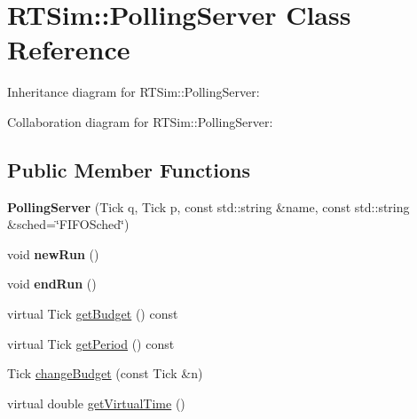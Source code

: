\hypertarget{classRTSim_1_1PollingServer}{}\section{R\+T\+Sim\+:\+:Polling\+Server Class Reference}
\label{classRTSim_1_1PollingServer}


Inheritance diagram for R\+T\+Sim\+:\+:Polling\+Server\+:


Collaboration diagram for R\+T\+Sim\+:\+:Polling\+Server\+:
\subsection*{Public Member Functions}
\begin{DoxyCompactItemize}
\item 
{\bfseries Polling\+Server} (Tick q, Tick p, const std\+::string \&name, const std\+::string \&sched=\char`\"{}F\+I\+F\+O\+Sched\char`\"{})\hypertarget{classRTSim_1_1PollingServer_af2c51ad7143c28f6b9cb95a1790c9998}{}\label{classRTSim_1_1PollingServer_af2c51ad7143c28f6b9cb95a1790c9998}

\item 
void {\bfseries new\+Run} ()\hypertarget{classRTSim_1_1PollingServer_a4d2658e714f1322fcc07c73e744f19d1}{}\label{classRTSim_1_1PollingServer_a4d2658e714f1322fcc07c73e744f19d1}

\item 
void {\bfseries end\+Run} ()\hypertarget{classRTSim_1_1PollingServer_a3e9dc29cb6d6c9c071f3ad91040b7480}{}\label{classRTSim_1_1PollingServer_a3e9dc29cb6d6c9c071f3ad91040b7480}

\item 
virtual Tick \hyperlink{classRTSim_1_1PollingServer_acc372522f1f24aa331969ae927b828a3}{get\+Budget} () const 
\item 
virtual Tick \hyperlink{classRTSim_1_1PollingServer_ab3fe53207fce5597242794c495a26d7c}{get\+Period} () const 
\item 
Tick \hyperlink{classRTSim_1_1PollingServer_aa16435ebd8d61cf7768bca27381f1ee2}{change\+Budget} (const Tick \&n)
\item 
virtual double \hyperlink{classRTSim_1_1PollingServer_ad29d9247dc3e8175587cec2f39f44e73}{get\+Virtual\+Time} ()
\end{DoxyCompactItemize}
